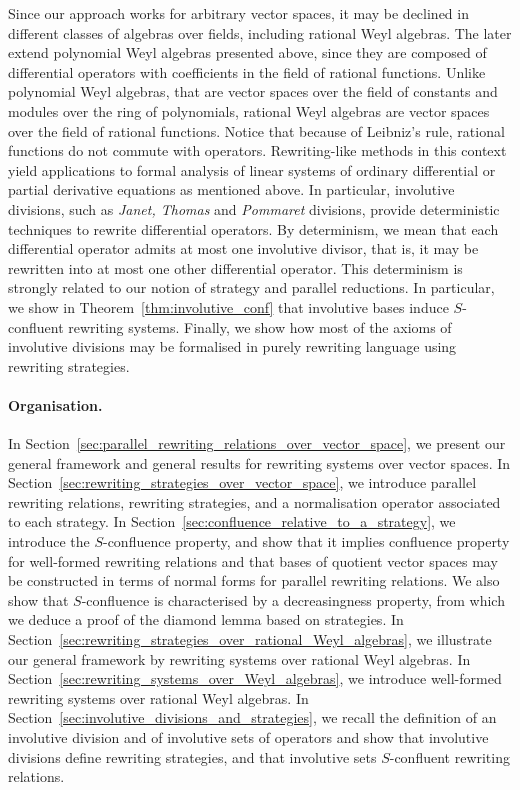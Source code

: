 \documentclass[11pt]{article}
\theoremstyle{definition}
\begin{document}
Since our approach works for arbitrary vector spaces, it may be declined
in different classes of algebras over fields, including rational Weyl
algebras. The later extend polynomial Weyl algebras presented above,
since they are composed of differential operators with coefficients in
the field of rational functions. Unlike polynomial Weyl algebras, that
are vector spaces over the field of constants and modules over the ring
of polynomials, rational Weyl algebras are vector spaces over the field
of rational functions. Notice that because of Leibniz's rule,
rational functions do not commute with operators. Rewriting-like methods
in this context yield applications to formal analysis of linear systems
of ordinary differential or partial derivative equations as mentioned
above. In particular, involutive divisions, such as {\em Janet, Thomas}
and {\em Pommaret} divisions, provide deterministic techniques to rewrite
differential operators. By determinism, we mean that each differential
operator admits at most one involutive divisor, that is, it may be
rewritten into at most one other differential operator. This determinism
is strongly related to our notion of strategy and parallel reductions. In
particular, we show in  Theorem~\ref{thm:involutive_conf} that involutive
bases induce $S$-confluent rewriting systems. Finally, we show how most
of the axioms of involutive divisions may be formalised in purely
rewriting language using rewriting strategies.
\medskip

\paragraph{Organisation.}

In Section~\ref{sec:parallel_rewriting_relations_over_vector_space}, we
present our general framework and general results for rewriting systems
over vector spaces. In
Section~\ref{sec:rewriting_strategies_over_vector_space}, we introduce
parallel rewriting relations, rewriting strategies, and a normalisation
operator associated to each strategy. In
Section~\ref{sec:confluence_relative_to_a_strategy}, we introduce the
$S$-confluence property, and show that it implies confluence property for
well-formed rewriting relations and that bases of quotient vector spaces
may be constructed in terms of normal forms for parallel rewriting
relations. We also show that $S$-confluence is characterised by a
decreasingness property, from which we deduce a proof of the diamond
lemma based on strategies. In
Section~\ref{sec:rewriting_strategies_over_rational_Weyl_algebras}, we
illustrate our general framework by rewriting systems over rational 
Weyl algebras. In Section~\ref{sec:rewriting_systems_over_Weyl_algebras},
we introduce well-formed rewriting systems over rational Weyl algebras. 
In Section~\ref{sec:involutive_divisions_and_strategies}, we recall the
definition of an involutive division and of involutive sets of operators
and show that involutive divisions define rewriting strategies, and that
involutive sets $S$-confluent rewriting relations.
\medskip
\end{document}
